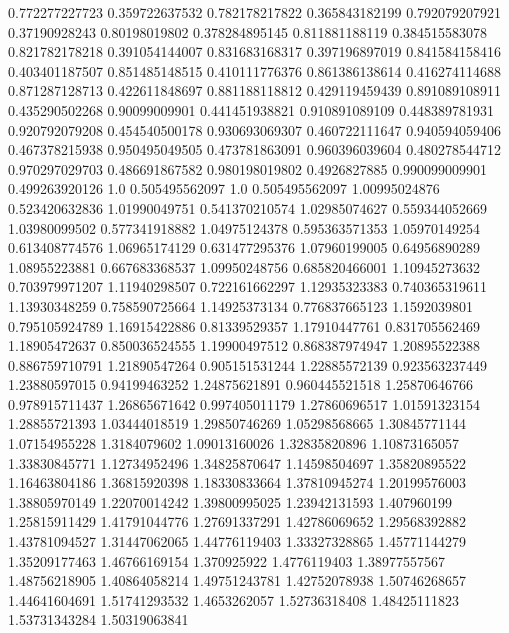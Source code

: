  0.772277227723   0.359722637532
 0.782178217822   0.365843182199
 0.792079207921    0.37190928243
  0.80198019802   0.378284895145
 0.811881188119   0.384515583078
 0.821782178218   0.391054144007
 0.831683168317   0.397196897019
 0.841584158416   0.403401187507
 0.851485148515   0.410111776376
 0.861386138614   0.416274114688
 0.871287128713   0.422611848697
 0.881188118812   0.429119459439
 0.891089108911   0.435290502268
  0.90099009901   0.441451938821
 0.910891089109   0.448389781931
 0.920792079208   0.454540500178
 0.930693069307   0.460722111647
 0.940594059406   0.467378215938
 0.950495049505   0.473781863091
 0.960396039604   0.480278544712
 0.970297029703   0.486691867582
 0.980198019802     0.4926827885
 0.990099009901   0.499263920126
            1.0   0.505495562097
            1.0   0.505495562097
  1.00995024876   0.523420632836
  1.01990049751   0.541370210574
  1.02985074627   0.559344052669
  1.03980099502   0.577341918882
  1.04975124378   0.595363571353
  1.05970149254   0.613408774576
  1.06965174129   0.631477295376
  1.07960199005    0.64956890289
  1.08955223881   0.667683368537
  1.09950248756   0.685820466001
  1.10945273632   0.703979971207
  1.11940298507   0.722161662297
  1.12935323383   0.740365319611
  1.13930348259   0.758590725664
  1.14925373134   0.776837665123
   1.1592039801   0.795105924789
  1.16915422886    0.81339529357
  1.17910447761   0.831705562469
  1.18905472637   0.850036524555
  1.19900497512   0.868387974947
  1.20895522388   0.886759710791
  1.21890547264   0.905151531244
  1.22885572139   0.923563237449
  1.23880597015    0.94199463252
  1.24875621891   0.960445521518
  1.25870646766   0.978915711437
  1.26865671642   0.997405011179
  1.27860696517    1.01591323154
  1.28855721393    1.03444018519
  1.29850746269    1.05298568665
  1.30845771144    1.07154955228
   1.3184079602    1.09013160026
  1.32835820896    1.10873165057
  1.33830845771    1.12734952496
  1.34825870647    1.14598504697
  1.35820895522    1.16463804186
  1.36815920398    1.18330833664
  1.37810945274    1.20199576003
  1.38805970149    1.22070014242
  1.39800995025    1.23942131593
    1.407960199    1.25815911429
  1.41791044776    1.27691337291
  1.42786069652    1.29568392882
  1.43781094527    1.31447062065
  1.44776119403    1.33327328865
  1.45771144279    1.35209177463
  1.46766169154      1.370925922
   1.4776119403    1.38977557567
  1.48756218905    1.40864058214
  1.49751243781    1.42752078938
  1.50746268657    1.44641604691
  1.51741293532     1.4653262057
  1.52736318408    1.48425111823
  1.53731343284    1.50319063841
